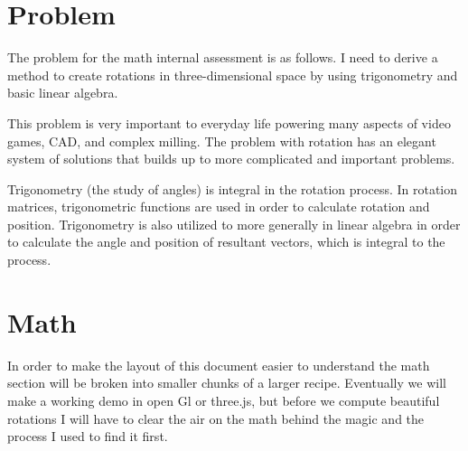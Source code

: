 \section{Problem}

\hspace{\parindent}%
The problem for the math internal assessment is as follows. I need to derive a method to create rotations in three-dimensional space by using trigonometry and basic linear algebra.

This problem is very important to everyday life powering many aspects of video games, CAD, and complex milling. The problem with rotation has an elegant system of solutions that builds up to more complicated and important problems.

Trigonometry (the study of angles) is integral in the rotation process. In rotation matrices, trigonometric functions are used in order to calculate rotation and position. Trigonometry is also utilized to more generally in linear algebra in order to calculate the angle and position of resultant vectors, which is integral to the process.

\section{Math}

\hspace{\parindent}%
In order to make the layout of this document easier to understand the math section will be broken into smaller chunks of a larger recipe. Eventually we will make a working demo in open Gl or three.js, but before we compute beautiful rotations I will have to clear the air on the math behind the magic and the process I used to find it first.



